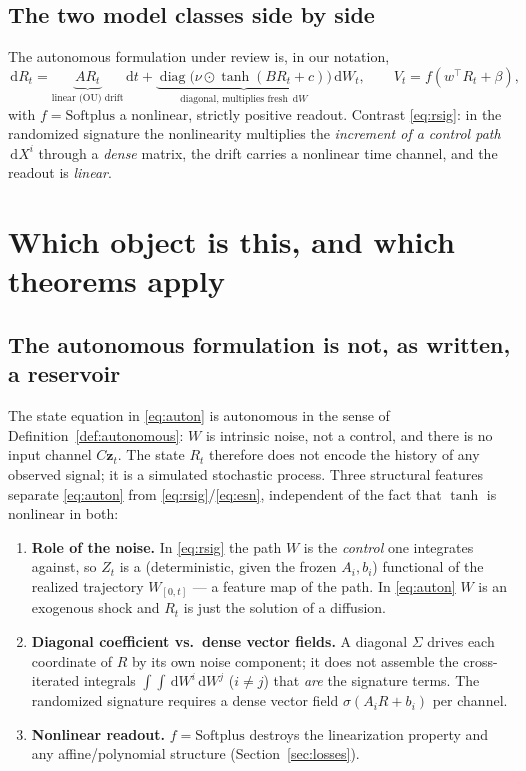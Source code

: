 \documentclass[11pt]{article}
\theoremstyle{definition}
\theoremstyle{plain}
\newcommand{\diag}{\operatorname{diag}}
\newcommand{\dd}{\,\mathrm{d}}
\begin{document}
\subsection{The two model classes side by side}

The autonomous formulation under review is, in our notation,
\begin{equation}
\label{eq:auton}
\dd R_t = \underbrace{A R_t}_{\text{linear (OU) drift}}\dd t
+ \underbrace{\diag\!\big(\nu\odot\tanh(B R_t + c)\big)}_{\text{diagonal, multiplies fresh }\dd W}\dd W_t,
\qquad
V_t = f\!\left(w^\top R_t + \beta\right),
\end{equation}
with $f=\mathrm{Softplus}$ a nonlinear, strictly positive readout. Contrast \eqref{eq:rsig}: in the randomized signature the nonlinearity multiplies the \emph{increment of a control path} $\dd X^i$ through a \emph{dense} matrix, the drift carries a nonlinear time channel, and the readout is \emph{linear}.

\section{Which object is this, and which theorems apply}
\label{sec:which}

\subsection{The autonomous formulation is not, as written, a reservoir}

The state equation in \eqref{eq:auton} is autonomous in the sense of Definition~\ref{def:autonomous}: $W$ is intrinsic noise, not a control, and there is no input channel $C\mathbf{z}_t$. The state $R_t$ therefore does not encode the history of any observed signal; it is a simulated stochastic process. Three structural features separate \eqref{eq:auton} from \eqref{eq:rsig}/\eqref{eq:esn}, independent of the fact that $\tanh$ is nonlinear in both:

\begin{enumerate}[label=(\alph*)]
\item \textbf{Role of the noise.} In \eqref{eq:rsig} the path $W$ is the \emph{control} one integrates against, so $Z_t$ is a (deterministic, given the frozen $A_i,b_i$) functional of the realized trajectory $W_{[0,t]}$ --- a feature map of the path. In \eqref{eq:auton} $W$ is an exogenous shock and $R_t$ is just the solution of a diffusion.
\item \textbf{Diagonal coefficient vs.\ dense vector fields.} A diagonal $\Sigma$ drives each coordinate of $R$ by its own noise component; it does not assemble the cross-iterated integrals $\int\!\int \dd W^i \dd W^j$ ($i\ne j$) that \emph{are} the signature terms. The randomized signature requires a dense vector field $\sigma(A_iR+b_i)$ per channel.
\item \textbf{Nonlinear readout.} $f=\mathrm{Softplus}$ destroys the linearization property and any affine/polynomial structure (Section~\ref{sec:losses}).
\end{enumerate}
\end{document}
